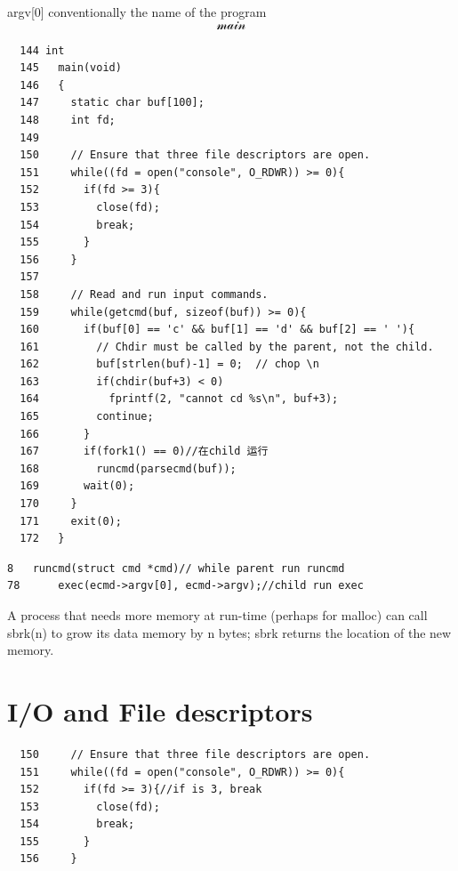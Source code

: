 \documentclass{thuemp}
\begin{document}
argv[0] conventionally the name of the program
$$\mathcal{main}$$
\begin{lstlisting}
  144 int
  145	main(void)
  146	{
  147	  static char buf[100];
  148	  int fd;
  149	
  150	  // Ensure that three file descriptors are open.
  151	  while((fd = open("console", O_RDWR)) >= 0){
  152	    if(fd >= 3){
  153	      close(fd);
  154	      break;
  155	    }
  156	  }
  157	
  158	  // Read and run input commands.
  159	  while(getcmd(buf, sizeof(buf)) >= 0){
  160	    if(buf[0] == 'c' && buf[1] == 'd' && buf[2] == ' '){
  161	      // Chdir must be called by the parent, not the child.
  162	      buf[strlen(buf)-1] = 0;  // chop \n
  163	      if(chdir(buf+3) < 0)
  164	        fprintf(2, "cannot cd %s\n", buf+3);
  165	      continue;
  166	    }
  167	    if(fork1() == 0)//在child 运行
  168	      runcmd(parsecmd(buf));
  169	    wait(0);
  170	  }
  171	  exit(0);
  172	}
\end{lstlisting}
\begin{lstlisting}
8	runcmd(struct cmd *cmd)// while parent run runcmd
78	    exec(ecmd->argv[0], ecmd->argv);//child run exec

\end{lstlisting}
A process that needs more memory at run-time
 (perhaps for malloc) can call sbrk(n) 
 to grow its data memory by n bytes; 
 sbrk returns the location of the new memory.
 \section*{I/O and File descriptors}

 \begin{lstlisting}
  150	  // Ensure that three file descriptors are open.
  151	  while((fd = open("console", O_RDWR)) >= 0){
  152	    if(fd >= 3){//if is 3, break
  153	      close(fd);
  154	      break;
  155	    }
  156	  }
 \end{lstlisting}
















\newpage
\end{document}
